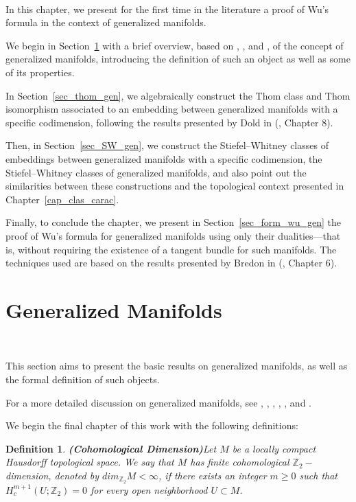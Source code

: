 \documentclass[12pt,oneside]{book}
\newtheorem{defi}   {Definition}[chapter]
\newcommand{\Z}{\mathbb{Z}}
\begin{document}
    \

    In this chapter, we present for the first time in the literature a proof of Wu's formula in the context of generalized 
    manifolds.

    We begin in Section~\ref{sec_varied_gen} with a brief overview, based on \cite{biasi}, \cite{denise}, and \cite{bredon_2}, of the concept 
    of generalized manifolds, introducing the definition of such an object as well as some of its properties.

    In Section~\ref{sec_thom_gen}, we algebraically construct the Thom class and Thom isomorphism associated to an embedding between 
    generalized manifolds with a specific codimension, following the results presented by Dold in (\cite{dold}, Chapter 8).

    Then, in Section~\ref{sec_SW_gen}, we construct the Stiefel–Whitney classes of embeddings between generalized 
    manifolds with a specific codimension, the Stiefel–Whitney classes of generalized manifolds, and also point out the similarities between 
    these constructions and the topological context presented in Chapter~\ref{cap_clas_carac}.

    Finally, to conclude the chapter, we present in Section~\ref{sec_form_wu_gen} the proof of Wu's formula for generalized manifolds using 
    only their dualities—that is, without requiring the existence of a tangent bundle for such manifolds. The techniques used are based on 
    the results presented by Bredon in (\cite{bredon}, Chapter 6).



    \section{Generalized Manifolds}\label{sec_varied_gen}

    \

    This section aims to present the basic results on generalized manifolds, as well as the formal definition of such objects.

    For a more detailed discussion on generalized manifolds, see \cite{biasi}, \cite{bredon_2}, \cite{mio_1}, \cite{mio_2}, \cite{denise}, 
    and \cite{wilder}.

    We begin the final chapter of this work with the following definitions:

    \begin{defi}{\bf (Cohomological Dimension)}\label{defi_dim_coh}
        Let $M$ be a locally compact Hausdorff topological space. We say that $M$ has finite cohomological $\Z_{2}-$dimension, denoted by 
        $dim_{\Z_{2}}M<\infty$\index{dim$_{\Z_{2}}<\infty$}, if there exists an integer $m\geq 0$ such that $H^{m+1}_{c}(U;\Z_{2})=0$ for every 
        open neighborhood $U\subset M$.
    \end{defi}
\end{document}
